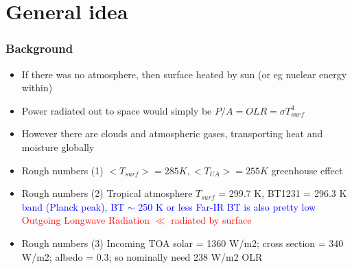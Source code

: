 \documentclass[10pt,t]{beamer}
\begin{document}
\section{General idea}
\begin{frame}
  \frametitle{Background}
  \begin{itemize}
  \item If there was no atmosphere, then surface heated by sun (or eg nuclear energy within)
  \item Power radiated out to space would simply be $P/A = OLR = \sigma T_{surf}^4$ 
  \item However there are clouds and atmospheric gases, transporting heat and moisture globally
  \item Rough numbers (1) $ <T_{surf}> = 285 K, <T_{UA}> = 255 K$ greenhouse effect
  \item Rough numbers (2) Tropical atmosphere $T_{surf}$ = 299.7 K, BT1231 = 296.3 K \newline
    \textcolor{blue}{ \um band (Planck peak), BT $\sim$ 250 K or less} \newline
    \textcolor{blue}{\water Far-IR  BT is also pretty low} \newline
    \textcolor{red}{Outgoing Longwave Radiation $\ll$ radiated by surface}
  \item Rough numbers (3) Incoming TOA solar = 1360 W/m2; cross section = 340 W/m2; albedo = 0.3;
        so nominally need 238 W/m2 OLR
  \end{itemize}
\end{frame}


  
\end{document}

